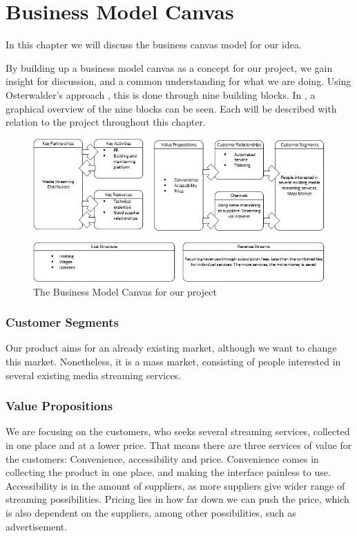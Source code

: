\section{Business Model Canvas}
\label{sec:business_canvas}
In this chapter we will discuss the business canvas model for our idea.

By building up a business model canvas as a concept for our project, we gain insight for discussion, and a common understanding for what we are doing. Using Osterwalder's approach \cite{canvas}, this is done through nine building blocks. In , a graphical overview of the nine blocks can be seen. Each will be described with relation to the project throughout this chapter.

\begin{figure}[h]
    \begin{center}
        \includegraphics[scale=0.7]{./pics/model_canvas}
        \caption{The Business Model Canvas for our project}
        \label{fig:model_canvas}
    \end{center}
\end{figure}


\subsubsection*{Customer Segments}
Our product aims for an already existing market, although we want to change this market. Nonetheless, it is a mass market, consisting of people interested in several existing media streaming services.

\subsubsection*{Value Propositions}
We are focusing on the customers, who seeks several streaming services, collected in one place and at a lower price. That means there are three services of value for the customers: Convenience, accessibility and price. Convenience comes in collecting the product in one place, and making the interface painless to use. Accessibility is in the amount of suppliers, as more suppliers give wider range of streaming possibilities. Pricing lies in how far down we can push the price, which is also dependent on the suppliers, among other possibilities, such as advertisement.

